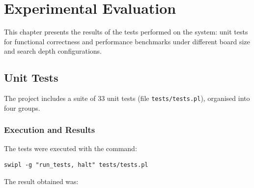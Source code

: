 
\chapter{Experimental Evaluation}
\label{chap:eval}

This chapter presents the results of the tests performed on the system:
unit tests for functional correctness and performance benchmarks
under different board size and search depth configurations.

\section{Unit Tests}
\label{sec:unit_tests}

The project includes a suite of 33 unit tests (file
\texttt{tests/tests.pl}), organised into four groups.

\subsection{Execution and Results}

The tests were executed with the command:

\begin{verbatim}
swipl -g "run_tests, halt" tests/tests.pl
\end{verbatim}

The result obtained was:

